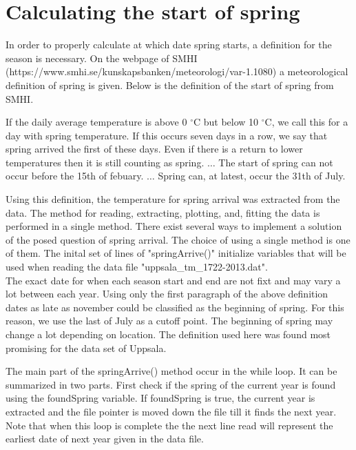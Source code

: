\documentclass[a4paper,12pt]{article}
\begin{document}
\section{Calculating the start of spring}
In order to properly calculate at which date spring starts, a 
definition for the season is necessary. On the webpage of SMHI 
(https://www.smhi.se/kunskapsbanken/meteorologi/var-1.1080)
a meteorological definition of spring is given. Below is the 
definition of the start of spring from SMHI.

\hfill\begin{minipage}[c]{\textwidth-2cm}
	If the daily average temperature is above 0 $^\circ$C but below 10 
	$^\circ$C, we call this for a day with spring temperature. If this 
	occurs seven days in a row,	we say that spring arrived the first of 
	these days. Even if there is a return to lower temperatures then it is
	still counting as spring.
	\newline
	$\ldots$
	\newline
	The start of spring can not occur before the 15th of febuary.
	\newline
	$\ldots$
	\newline
	Spring can, at latest, occur the 31th of July.
\end{minipage}

\noindent Using this definition, the temperature for spring arrival was 
extracted from the data. The method for reading, extracting, plotting, 
and, fitting the data is performed in a single method. There exist 
several ways to implement a solution of the posed question of spring 
arrival. The choice of using a single method is one of them. The inital 
set of lines of "springArrive()" initialize variables that will be used 
when reading the data file "uppsala\_tm\_1722-2013.dat".
\\\indent
The exact date for when each season start and end are not fixt and may 
vary a lot between each year. Using only the first paragraph of the 
above definition dates as late as november could be classified as the 
beginning of spring. For this reason, we use the last of July as a 
cutoff point. The beginning of spring may change a lot depending on 
location. The definition used here was found most promising for the 
data set of Uppsala. 

The main part of the springArrive() method occur in the while loop. It 
can be summarized in two parts. First check if the spring of the 
current year is found using the foundSpring variable. If foundSpring is 
true, the current year is extracted and the file pointer is moved down 
the file till it finds the next year. Note that when this loop is 
complete the the next line read will represent the earliest date
of next year given in the data file.
\end{document}
